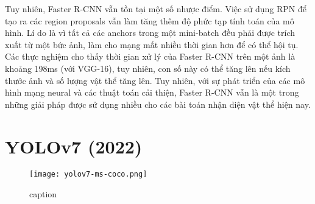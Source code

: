 Tuy nhiên, Faster R-CNN vẫn tồn tại một số nhược điểm. Việc sử dụng RPN để tạo ra các region proposals vẫn làm tăng thêm độ phức tạp tính toán của mô hình. Lí do là vì tất cả các anchors trong một mini-batch đều phải được trích xuất từ một bức ảnh, làm cho mạng mất nhiều thời gian hơn để có thể hội tụ. Các thực nghiệm cho thấy thời gian xử lý của Faster R-CNN trên một ảnh là khoảng 198ms (với VGG-16), tuy nhiên, con số này có thể tăng lên nếu kích thước ảnh và số lượng vật thể tăng lên. Tuy nhiên, với sự phát triển của các mô hình mạng neural và các thuật toán cải thiện, Faster R-CNN vẫn là một trong những giải pháp được sử dụng nhiều cho các bài toán nhận diện vật thể hiện nay.

\section{YOLOv7 (2022)}

\begin{figure}[h]
	\center
	\texttt{[image: yolov7-ms-coco.png]}
	\caption{caption}
\end{figure}